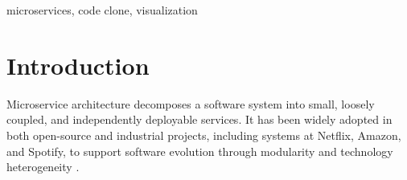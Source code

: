 \documentclass[conference]{IEEEtran}
\begin{document}
\begin{abstract}

\end{abstract}

\begin{IEEEkeywords}
microservices, code clone, visualization
\end{IEEEkeywords}


\section{Introduction}

Microservice architecture decomposes a software system into small, loosely
coupled, and independently deployable services. It has been widely adopted
in both open-source and industrial projects, including systems at Netflix,
Amazon, and Spotify, to support software evolution through modularity and
technology heterogeneity
\cite{Richardson2018MicroservicesPatterns,Newman2021BuildingMicroservices,LewisFowler2014Microservices}.
\end{document}
